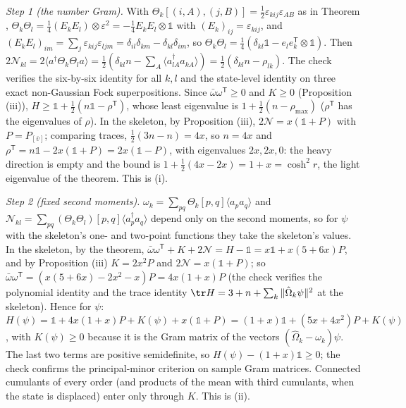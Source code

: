\emph{Step 1 (the number Gram).} With $\Theta_{k}[(i,A),(j,B)] = \tfrac12\varepsilon_{kij}\varepsilon_{AB}$ as in Theorem , $\Theta_{k}\Theta_{l} = \tfrac14 (E_{k}E_{l}) \otimes \varepsilon^{2} = -\tfrac14 E_{k}E_{l} \otimes \mathbb{1}$ with $(E_{k})_{ij} = \varepsilon_{kij}$, and $(E_{k}E_{l})_{im} = \sum_{j}\varepsilon_{kij}\varepsilon_{ljm} = \delta_{il}\delta_{km} - \delta_{kl}\delta_{im}$, so $\Theta_{k}\Theta_{l} = \tfrac14(\delta_{kl}\mathbb{1} - e_{l}e_{k}^{\mathsf{T}} \otimes \mathbb{1})$. Then $2\mathcal{N}_{kl} = 2\langle a^{\dagger}\Theta_{k}\Theta_{l}a\rangle = \tfrac12(\delta_{kl}n - \sum_{A}\langle a_{lA}^{\dagger}a_{kA}\rangle) = \tfrac12(\delta_{kl}n - \rho_{lk})$. The check verifies the six-by-six identity for all $k, l$ and the state-level identity on three exact non-Gaussian Fock superpositions. Since $\bar\omega\omega^{\mathsf{T}} \ge 0$ and $K \ge 0$ (Proposition (iii)), $H \ge \mathbb{1} + \tfrac12(n\mathbb{1} - \rho^{\mathsf{T}})$, whose least eigenvalue is $1 + \tfrac12(n - \rho_{\max})$ ($\rho^{\mathsf{T}}$ has the eigenvalues of $\rho$). In the skeleton, by Proposition (iii), $2\mathcal{N} = x(\mathbb{1} + P)$ with $P = P_{[\bar v]}$; comparing traces, $\tfrac12(3n - n) = 4x$, so $n = 4x$ and $\rho^{\mathsf{T}} = n\mathbb{1} - 2x(\mathbb{1} + P) = 2x(\mathbb{1} - P)$, with eigenvalues $2x, 2x, 0$: the heavy direction is empty and the bound is $1 + \tfrac12(4x - 2x) = 1 + x = \cosh^{2}r$, the light eigenvalue of the theorem. This is (i).

\emph{Step 2 (fixed second moments).} $\omega_{k} = \sum_{pq}\Theta_{k}[p,q]\langle a_{p}a_{q}\rangle$ and $\mathcal{N}_{kl} = \sum_{pq}(\Theta_{k}\Theta_{l})[p,q]\langle a_{p}^{\dagger}a_{q}\rangle$ depend only on the second moments, so for $\psi$ with the skeleton's one- and two-point functions they take the skeleton's values. In the skeleton, by the theorem, $\bar\omega\omega^{\mathsf{T}} + K + 2\mathcal{N} = H - \mathbb{1} = x\mathbb{1} + x(5 + 6x)P$, and by Proposition (iii) $K = 2x^{2}P$ and $2\mathcal{N} = x(\mathbb{1} + P)$; so $\bar\omega\omega^{\mathsf{T}} = (x(5 + 6x) - 2x^{2} - x)P = 4x(1 + x)P$ (the check verifies the polynomial identity and the trace identity $\tr H = 3 + n + \sum_{k}\|\hat\Omega_{k}\psi\|^{2}$ at the skeleton). Hence for $\psi$: $H(\psi) = \mathbb{1} + 4x(1 + x)P + K(\psi) + x(\mathbb{1} + P) = (1 + x)\mathbb{1} + (5x + 4x^{2})P + K(\psi)$, with $K(\psi) \ge 0$ because it is the Gram matrix of the vectors $(\hat\Omega_{k} - \omega_{k})\psi$. The last two terms are positive semidefinite, so $H(\psi) - (1 + x)\mathbb{1} \ge 0$; the check confirms the principal-minor criterion on sample Gram matrices. Connected cumulants of every order (and products of the mean with third cumulants, when the state is displaced) enter only through $K$. This is (ii).

